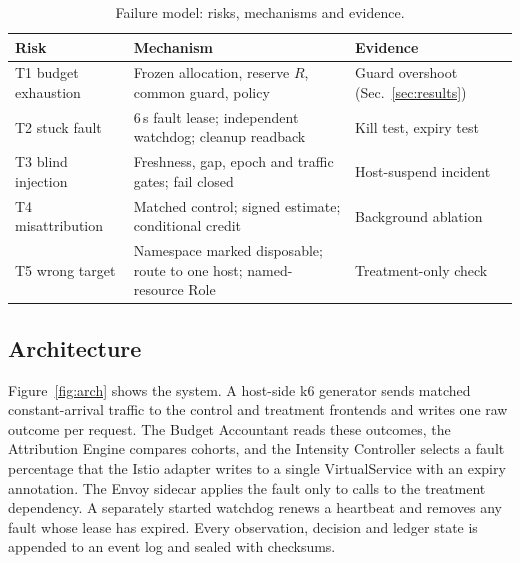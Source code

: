 \documentclass[a4paper,fleqn,11pt]{cas-dc}
\begin{document}
\begin{table}[width=.95\linewidth,cols=3,pos=t]
\caption{Failure model: risks, mechanisms and evidence.}\label{tbl:threats}
\footnotesize
\begin{tabular*}{\tblwidth}{@{}L{1.6cm}L{3.0cm}L{2.4cm}@{}}
\toprule
Risk & Mechanism & Evidence \\
\midrule
T1 budget exhaustion & Frozen allocation, reserve $R$, common guard, policy & Guard overshoot (Sec.~\ref{sec:results}) \\
T2 stuck fault & 6\,s fault lease; independent watchdog; cleanup readback & Kill test, expiry test \\
T3 blind injection & Freshness, gap, epoch and traffic gates; fail closed & Host-suspend incident \\
T4 misattribution & Matched control; signed estimate; conditional credit & Background ablation \\
T5 wrong target & Namespace marked disposable; route to one host; named-resource Role & Treatment-only check \\
\bottomrule
\end{tabular*}
\end{table}

\subsection{Architecture}
Figure~\ref{fig:arch} shows the system. A host-side k6 generator sends matched constant-arrival traffic to the control and treatment frontends and writes one raw outcome per request. The Budget Accountant reads these outcomes, the Attribution Engine compares cohorts, and the Intensity Controller selects a fault percentage that the Istio adapter writes to a single VirtualService with an expiry annotation. The Envoy sidecar applies the fault only to calls to the treatment dependency. A separately started watchdog renews a heartbeat and removes any fault whose lease has expired. Every observation, decision and ledger state is appended to an event log and sealed with checksums.
\end{document}
